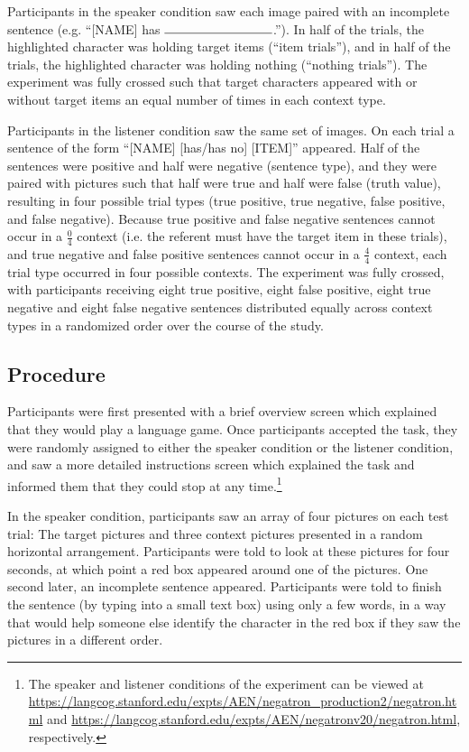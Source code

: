 \documentclass[man, noapacite]{apa2}
\begin{document}
Participants in the speaker condition saw each image paired with an incomplete sentence (e.g. ``[NAME] has $\rule{3cm}{0.15mm}$.''). In half of the trials, the highlighted character was holding target items (``item trials''), and in half of the trials, the highlighted character was holding nothing (``nothing trials'').  The experiment was fully crossed such that target characters appeared with or without target items an equal number of times in each context type.  

Participants in the listener condition saw the same set of images.  On each trial a sentence of the form ``[NAME] [has/has no] [ITEM]'' appeared.  Half of the sentences were positive and half were negative (sentence type), and they were paired with pictures such that half were true and half were false (truth value), resulting in four possible trial types (true positive, true negative, false positive, and false negative).  Because true positive and false negative sentences cannot occur in a $\frac{0}{4}$ context (i.e. the referent must have the target item in these trials), and true negative and false positive sentences cannot occur in a $\frac{4}{4}$ context, each trial type occurred in four possible contexts.  The experiment was fully crossed, with participants receiving eight true positive, eight false positive, eight true negative and eight false negative sentences distributed equally across context types in a randomized order over the course of the study.  

\subsection{Procedure}

Participants were first presented with a brief overview screen which explained that they would play a language game.  Once participants accepted the task, they were randomly assigned to either the speaker condition or the listener condition, and saw a more detailed instructions screen which explained the task and informed them that they could stop at any time.\footnote{The speaker and listener conditions of the experiment can be viewed at \url{https://langcog.stanford.edu/expts/AEN/negatron_production2/negatron.html} and \url{https://langcog.stanford.edu/expts/AEN/negatronv20/negatron.html}, respectively.}

In the speaker condition, participants saw an array of four pictures on each test trial: The target pictures and three context pictures presented in a random horizontal arrangement.  Participants were told to look at these pictures for four seconds, at which point a red box appeared around one of the pictures.  One second later, an incomplete sentence appeared.  Participants were told to finish the sentence (by typing into a small text box) using only a few words, in a way that would help someone else identify the character in the red box if they saw the pictures in a different order.
\end{document}
